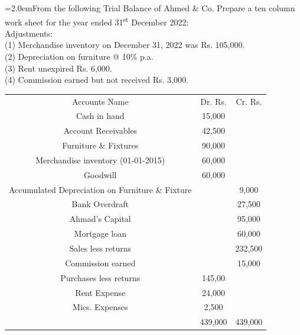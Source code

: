 \documentclass[11pt,a4paper]{article}
\newcommand{\lqn}[2]{\Needspace{6\baselineskip}\par\medskip\noindent\hangindent=2.0em\hangafter=1\makebox[2.0em][l]{\textbf{#1.}}#2\par}
\begin{document}
\lqn{111}{From the following Trial Balance of Ahmed \& Co. Prepare a ten column work sheet for the year ended 31\textsuperscript{st} December 2022:\\
Adjustments:\\
(1) Merchandise inventory on December 31, 2022 was Rs. 105,000.\\
(2) Depreciation on furniture @ 10\% p.a.\\
(3) Rent unexpired Rs. 6,000.\\
(4) Commission earned but not received Rs. 3,000.\par
\par\smallskip\noindent\hspace*{1.2em}\begin{tabular}{|ccc|}
\hline
Accounts Name & Dr. Rs. & Cr. Rs. \\
Cash in hand & 15,000 &  \\
Account Receivables & 42,500 &  \\
Furniture \& Fixtures & 90,000 &  \\
Merchandise inventory (01-01-2015) & 60,000 &  \\
Goodwill & 60,000 &  \\
Accumulated Depreciation on Furniture \& Fixture &  & 9,000 \\
Bank Overdraft &  & 27,500 \\
Ahmad's Capital &  & 95,000 \\
Mortgage loan &  & 60,000 \\
Sales less returns &  & 232,500 \\
Commission earned &  & 15,000 \\
Purchases less returns & 145,00 &  \\
Rent Expense & 24,000 &  \\
Mics. Expenses & 2,500 &  \\
 & 439,000 & 439,000 \\
\hline
\end{tabular}\par\smallskip
}
\end{document}
